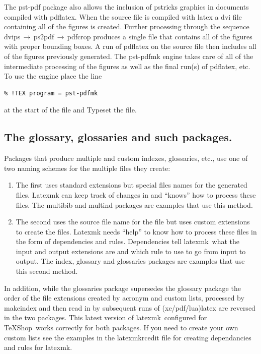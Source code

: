 \documentclass[11pt]{article}
\newcommand{\cmd}[1]{\textsf{#1}}
\newcommand{\To}{\,\(\to\)\,}
\newcommand{\TS}{\textsf{\TeX Shop}}
\newcommand{\latexmk}{\textsf{latexmk}}
\begin{document}
The \cmd{pst-pdf} package also allows the inclusion of \cmd{pstricks} graphics in documents compiled with \cmd{pdflatex}. When the source file is compiled with \cmd{latex} a \cmd{dvi} file containing all of the figures is created. Further processing through the sequence \cmd{dvips}\To\cmd{ps2pdf}\To\cmd{pdfcrop} produces a single file that contains all of the figures with proper bounding boxes. A run of \cmd{pdflatex} on the source file then includes all of the figures previously generated. The \cmd{pst-pdfmk} engine takes care of all of the intermediate processing of the figures as well as the final run(s) of \cmd{pdflatex}, etc. To use the engine place the line
\begin{verbatim}
% !TEX program = pst-pdfmk
\end{verbatim}
at the start of the file and Typeset the file.

\subsection{The \cmd{glossary}, \cmd{glossaries} and such packages.}

Packages that produce multiple and custom indexes, glossaries, etc., use one of two naming schemes for the multiple files they create:
\begin{enumerate}
\item
The first uses standard extensions but special files names for the generated files. \cmd{Latexmk} can keep track of changes in and ``knows'' how to process these files. The \cmd{multibib} and \cmd{multind} packages are examples that use this method.
\item
The second uses the source file name for the file but uses custom extensions to create the files. \cmd{Latexmk} needs ``help'' to know how to process these files in the form of dependencies and rules. Dependencies tell \latexmk\ what the input and output extensions are and which rule to use to go from input to output. The \cmd{index}, \cmd{glossary} and \cmd{glossaries} packages are examples that use this second method.
\end{enumerate}

In addition, while the \cmd{glossaries} package supersedes the \cmd{glossary} package the order of the file extensions created by acronym and custom lists, processed by \cmd{makeindex} and then read in by subsequent runs of \cmd{(xe/pdf/lua)latex} are reversed in the two packages. This latest version of \latexmk\ configured for \TS\ works correctly for both packages. If you need to create your own custom lists see the examples in the \cmd{latexmkrcedit} file for creating dependancies and rules for \latexmk.
\end{document}
